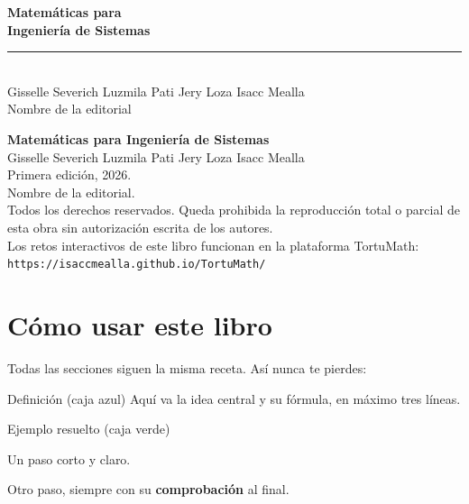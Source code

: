 \thispagestyle{empty}
\vspace*{\fill}
\begin{center}
{\sffamily\bfseries\Huge\color{tmNavy} Matem\'aticas para\\Ingenier\'ia de Sistemas}\\[10pt]
{\color{tmOro}\rule{6cm}{1.4pt}}\\[10pt]
{\sffamily\large Gisselle Severich \;\textbullet\; Luzmila Pati \;\textbullet\; Jery Loza \;\textbullet\; Isacc Mealla}\\[6pt]
{\sffamily\small\color{tmGris} Nombre de la editorial}
\end{center}
\vspace*{\fill}
\cleardoublepage

\thispagestyle{empty}
\vspace*{\fill}
{\sffamily\small\color{tmGris}
\textbf{Matem\'aticas para Ingenier\'ia de Sistemas}\\
Gisselle Severich \;\textbullet\; Luzmila Pati \;\textbullet\; Jery Loza \;\textbullet\; Isacc Mealla\\[4pt]
Primera edici\'on, 2026.\\
Nombre de la editorial.\\[4pt]
Todos los derechos reservados. Queda prohibida la reproducci\'on total o parcial de esta obra sin autorizaci\'on escrita de los autores.\\[4pt]
Los retos interactivos de este libro funcionan en la plataforma TortuMath:\\
\texttt{https://isaccmealla.github.io/TortuMath/}}
\cleardoublepage

\chapter*{C\'omo usar este libro}

Todas las secciones siguen la misma receta. As\'i nunca te pierdes:

\begin{tmdef}{Definici\'on (caja azul)}
Aqu\'i va la idea central y su f\'ormula, en m\'aximo tres l\'ineas.
\end{tmdef}

\begin{tmejemplo}{Ejemplo resuelto (caja verde)}
\begin{tmpasos}
\item Un paso corto y claro.
\item Otro paso, siempre con su \textbf{comprobaci\'on} al final.
\end{tmpasos}
\end{tmejemplo}

